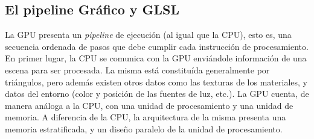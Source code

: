 \subsection{El pipeline Gráfico y GLSL}
La GPU presenta un {\em pipeline} de ejecución (al igual que la CPU), esto es, una secuencia ordenada de pasos que debe cumplir cada instrucci\'on de procesamiento.
En primer lugar, la CPU se comunica con la GPU enviándole información de una escena para ser procesada.
La misma está constituída generalmente por triángulos, pero además existen otros datos como las texturas de los materiales, y datos del entorno (color y posición de las fuentes de luz, etc.).
La GPU cuenta, de manera análoga a la CPU, con una unidad de procesamiento y una unidad de memoria.
A diferencia de la CPU, la arquitectura de la misma presenta una memoria estratificada, y un diseño paralelo de la unidad de procesamiento.

